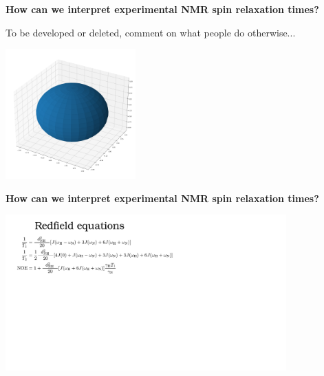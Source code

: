 \documentclass{beamer}
\begin{document}
\begin{frame}
\LARGE{\centering
\textbf{How can we interpret experimental NMR spin relaxation times?} \\}

To be developed or deleted, comment on what people do otherwise...

\begin{center}
 \includegraphics[height=5cm]{kolo.png}
\end{center}


\end{frame}



\begin{frame}
\begin{center}
\Large{\centering
\textbf{How can we interpret experimental NMR spin relaxation times?} \\}

\vspace{0.5cm}


\includegraphics[height=6cm]{redfield1.pdf}
\end{center}
\end{frame}
\end{document}
